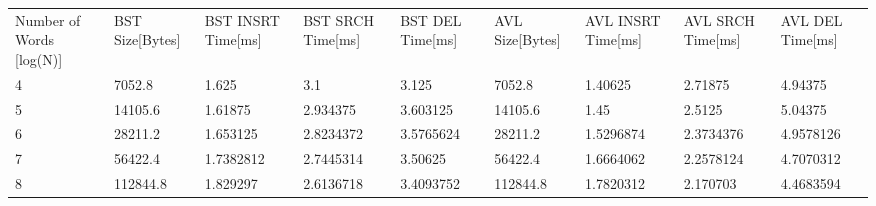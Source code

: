 \documentclass[12pt,letterpaper,hidelinks]{extarticle}
\begin{document}
\begin{table}[]
\centering
\begin{tabular}{lllllllll}
Number of Words {[}log(N){]} & BST Size{[}Bytes{]} & BST INSRT Time{[}ms{]} & BST SRCH Time{[}ms{]} & BST DEL Time{[}ms{]} & AVL Size{[}Bytes{]} & AVL INSRT Time{[}ms{]} & AVL SRCH Time{[}ms{]} & AVL DEL Time{[}ms{]} \\
4                            & 7052.8              & 1.625                  & 3.1                   & 3.125                & 7052.8              & 1.40625                & 2.71875               & 4.94375              \\
5                            & 14105.6             & 1.61875                & 2.934375              & 3.603125             & 14105.6             & 1.45                   & 2.5125                & 5.04375              \\
6                            & 28211.2             & 1.653125               & 2.8234372             & 3.5765624            & 28211.2             & 1.5296874              & 2.3734376             & 4.9578126            \\
7                            & 56422.4             & 1.7382812              & 2.7445314             & 3.50625              & 56422.4             & 1.6664062              & 2.2578124             & 4.7070312            \\
8                            & 112844.8            & 1.829297               & 2.6136718             & 3.4093752            & 112844.8            & 1.7820312              & 2.170703              & 4.4683594
\end{tabular}
\end{table}
\end{document}
